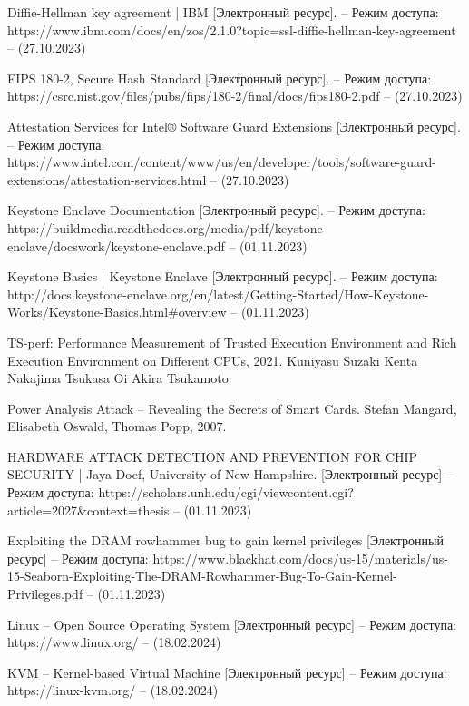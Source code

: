 \begin{thebibliography}{}
Diffie-Hellman key agreement | IBM [Электронный ресурс]. – Режим доступа: https://www.ibm.com/docs/en/zos/2.1.0?topic=ssl-diffie-hellman-key-agreement – (27.10.2023)

FIPS 180-2, Secure Hash Standard [Электронный ресурс]. – Режим доступа: https://csrc.nist.gov/files/pubs/fips/180-2/final/docs/fips180-2.pdf – (27.10.2023)

Attestation Services for Intel® Software Guard Extensions [Электронный ресурс]. – Режим доступа: https://www.intel.com/content/www/us/en/developer/tools/software-guard-extensions/attestation-services.html – (27.10.2023)

Keystone Enclave Documentation [Электронный ресурс]. – Режим доступа: https://buildmedia.readthedocs.org/media/pdf/keystone-enclave/docswork/keystone-enclave.pdf – (01.11.2023)

Keystone Basics | Keystone Enclave [Электронный ресурс]. – Режим доступа: http://docs.keystone-enclave.org/en/latest/Getting-Started/How-Keystone-Works/Keystone-Basics.html\#overview – (01.11.2023)

TS-perf: Performance Measurement of Trusted Execution Environment and Rich Execution Environment on Different CPUs, 2021. Kuniyasu Suzaki Kenta Nakajima Tsukasa Oi Akira Tsukamoto

Power Analysis Attack -- Revealing the Secrets of Smart Cards. Stefan Mangard, Elisabeth Oswald, Thomas Popp, 2007.

HARDWARE ATTACK DETECTION AND PREVENTION FOR CHIP SECURITY | Jaya Doef, University of New Hampshire. [Электронный ресурс] – Режим доступа: https://scholars.unh.edu/cgi/viewcontent.cgi?article=2027\&context=thesis – (01.11.2023)

Exploiting the DRAM rowhammer bug to gain kernel privileges [Электронный ресурс] – Режим доступа: https://www.blackhat.com/docs/us-15/materials/us-15-Seaborn-Exploiting-The-DRAM-Rowhammer-Bug-To-Gain-Kernel-Privileges.pdf – (01.11.2023)

Linux -- Open Source Operating System [Электронный ресурс] – Режим доступа: https://www.linux.org/ – (18.02.2024)

KVM -- Kernel-based Virtual Machine [Электронный ресурс] – Режим доступа: https://linux-kvm.org/ – (18.02.2024)


\end{thebibliography}
